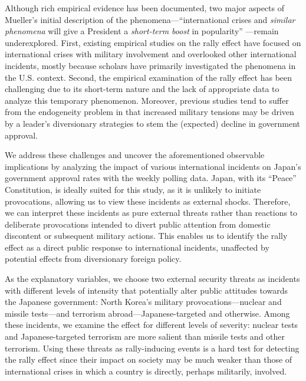 \documentclass[letterpaper,12pt]{scrartcl}
\begin{document}
Although rich empirical evidence has been documented, two major aspects of Mueller's initial description of the phenomena---``international crises and \textit{similar phenomena} will give a President a \textit{short-term boost} in popularity'' \citep[][p.~20; emphasis added by authors]{Mueller1970APSR}---remain underexplored. First, existing empirical studies on the rally effect have focused on international crises with military involvement and overlooked other international incidents, mostly because scholars have primarily investigated the phenomena in the U.S. context. Second, the empirical examination of the rally effect has been challenging due to its short-term nature and the lack of appropriate data to analyze this temporary phenomenon. Moreover, previous studies tend to suffer from the endogeneity problem in that increased military tensions may be driven by a leader's diversionary strategies to stem the (expected) decline in government approval.



We address these challenges and uncover the aforementioned observable implications by analyzing the impact of various international incidents on Japan's government approval rates with the weekly polling data. Japan, with its ``Peace'' Constitution, is ideally suited for this study, as it is unlikely to initiate provocations, allowing us to view these incidents as external shocks. Therefore, we can interpret these incidents as pure external threats rather than reactions to deliberate provocations intended to divert public attention from domestic discontent or subsequent military actions. This enables us to identify the rally effect as a direct public response to international incidents, unaffected by potential effects from diversionary foreign policy.

As the explanatory variables, we choose two external security threats as incidents with different levels of intensity that potentially alter public attitudes towards the Japanese government: North Korea's military provocations---nuclear and missile tests---and terrorism abroad---Japanese-targeted and otherwise. Among these incidents, we examine the effect for different levels of severity: nuclear tests and Japanese-targeted terrorism are more salient than missile tests and other terrorism. Using these threats as rally-inducing events is a hard test for detecting the rally effect since their impact on society may be much weaker than those of international crises in which a country is directly, perhaps militarily, involved.
\end{document}
